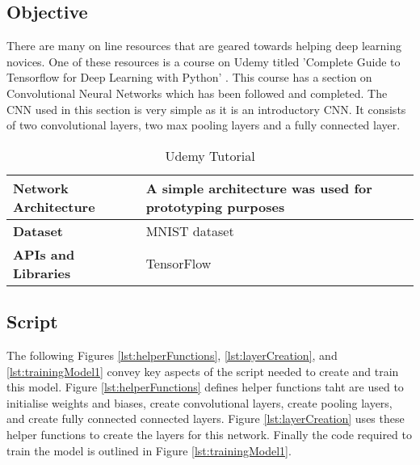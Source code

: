 \tocless\subsection{Objective}
There are many on line resources that are geared towards helping deep learning novices.
One of these resources is a course on Udemy titled 'Complete Guide to Tensorflow for Deep Learning with Python' \parencite{udemy}.
This course has a section on Convolutional Neural Networks which has been followed and completed.
The CNN used in this section is very simple as it is an introductory CNN.
It consists of two convolutional layers, two max pooling layers and a fully connected layer.

\begin{table}[h]
\centering
\caption{Udemy Tutorial}
\label{my-label}
\begin{tabular}{|l|p{8cm}|}
\hline
\textbf{Network Architecture} & A simple architecture was used for prototyping purposes            \\ \hline
\textbf{Dataset}              & MNIST dataset \\ \hline
\textbf{APIs and Libraries}   & TensorFlow                                                         \\ \hline
\end{tabular}
\end{table}

\tocless\subsection{Script}
The following Figures \ref{lst:helperFunctions}, \ref{lst:layerCreation}, and \ref{lst:trainingModel1} convey key aspects of the script needed to create and train this model.
Figure \ref{lst:helperFunctions} defines helper functions taht are used to initialise weights and biases, create convolutional layers, create pooling layers, and create fully connected connected layers.
Figure \ref{lst:layerCreation} uses these helper functions to create the layers for this network.
Finally the code required to train the model is outlined in Figure \ref{lst:trainingModel1}.


